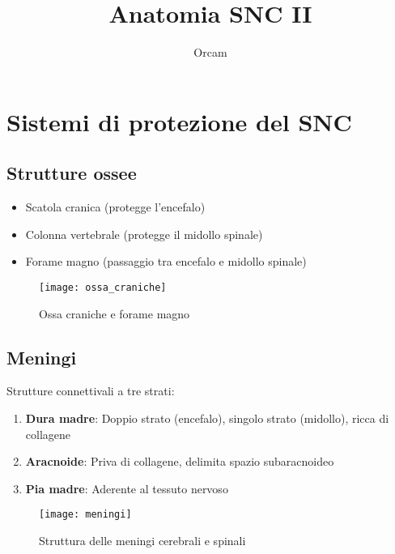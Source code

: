 \documentclass[11pt]{article}
\title{Anatomia SNC II}
\author{Orcam}
\date{}
\begin{document}
\maketitle

\section*{Sistemi di protezione del SNC}

\subsection*{Strutture ossee}
\begin{itemize}
    \item Scatola cranica (protegge l'encefalo)
    \item Colonna vertebrale (protegge il midollo spinale)
    \item Forame magno (passaggio tra encefalo e midollo spinale)
\end{itemize}
\begin{figure}[h]
    \centering
    \texttt{[image: ossa\_craniche]} %
    \caption{Ossa craniche e forame magno}
    \label{fig:ossa}
\end{figure}

\subsection*{Meningi}
Strutture connettivali a tre strati:
\begin{enumerate}
    \item \textbf{Dura madre}: Doppio strato (encefalo), singolo strato (midollo), ricca di collagene
    \item \textbf{Aracnoide}: Priva di collagene, delimita spazio subaracnoideo
    \item \textbf{Pia madre}: Aderente al tessuto nervoso
\end{enumerate}
\begin{figure}[h]
    \centering
    \texttt{[image: meningi]} %
    \caption{Struttura delle meningi cerebrali e spinali}
    \label{fig:meningi}
\end{figure}
\end{document}
